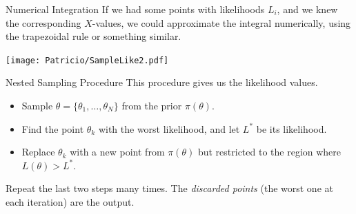 \begin{frame}{Numerical Integration}
If we had some points with likelihoods $L_i$, and we knew the corresponding
$X$-values, we could approximate the integral numerically, using the
trapezoidal rule or something similar.
\begin{center}
\texttt{[image: Patricio/SampleLike2.pdf]}
\end{center}
\end{frame}
\begin{frame}{Nested Sampling Procedure}
This procedure gives us the likelihood values. \\

\begin{itemize}
	\item Sample $\theta=\{\theta_{1}, \ldots , \theta_{N}\}$ from the prior $\pi(\theta)$.
	\item Find the point $\theta_k$ with the worst
likelihood, and let $L^*$ be its likelihood.
	\item Replace $\theta_{k}$ with a new point from $\pi(\theta)$ but restricted to the region where $L(\theta)>L^*$.
\end{itemize}

Repeat the last two steps many times.
The \textit{discarded points} (the worst one at each iteration) are the output.
\end{frame}


